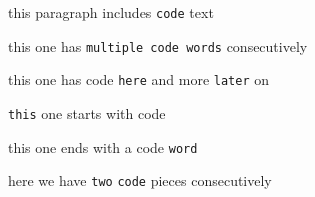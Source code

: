 
this paragraph includes \verb|code|  text

this one has \verb|multiple code words|  consecutively

this one has code \verb|here| and more \verb|later|  on

\verb|this| one starts with code

this one ends with a code \verb|word|

here we have \verb|two| \verb|code| pieces consecutively
